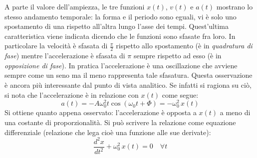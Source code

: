 \documentclass[10pt,a4paper]{book}
\begin{document}
A parte il valore dell'ampiezza, le tre funzioni $x(t)$, $v(t)$ e $a(t)$ mostrano lo stesso andamento temporale: la forma e il periodo sono eguali, vi è solo uno spostamento di una rispetto all'altra lungo l'asse dei tempi. Quest'ultima caratteristica viene indicata dicendo che le funzioni sono sfasate fra loro.
In particolare la velocità è sfasata di $\frac{\pi}{2}$ rispetto allo spostamento (è in \emph{quadratura di fase}) mentre l'accelerazione è sfasata di $\pi$ sempre rispetto ad esso (è in \emph{opposizione di fase}). In pratica l'accelerazione è una oscillazione che avviene sempre come un seno ma il meno rappresenta tale sfasatura. Questa osservazione è ancora più interessante dal punto di vista analitico. Se infatti si ragiona su ciò, si nota che l'accelerazione è in relazione con $x(t)$ come segue:
\[
	a(t)=-A\omega^2_0 t\cos(\omega_0 t+\Phi)=-\omega^2_0\,x(t)
\]
Si ottiene quanto appena osservato: l'accelerazione è opposta a $x(t)$ a meno di una costante di proporzionalità.
Si può scrivere la relazione come equazione differenziale (relazione che lega cioè una funzione alle sue derivate):
\[
	\frac{d^2x}{dt^2}+\omega^2_0\,x(t)=0 \quad \forall t
\]
\end{document}
